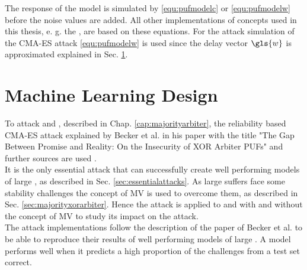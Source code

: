 The response of the \apuf model is simulated by \ref{equ:pufmodelc} or \ref{equ:pufmodelw} before the noise values are added.
All other implementations of \puf concepts used in this thesis, e. g. the \mpuf, are based on these \apuf equations.
For the attack simulation of the \ac{CMA-ES} attack \ref{equ:pufmodelw} is used since the delay vector $\gls{w}$ is approximated explained in Sec. \ref{sec:machinelearningdesign}.


\section{Machine Learning Design}
\label{sec:machinelearningdesign}

To attack \mpufs and \mxpufs, described in Chap. \ref{cap:majorityarbiter}, the reliability based \ac{CMA-ES} attack explained by Becker et al. in his paper with the title "The Gap Between Promise and Reality: On the Insecurity of XOR Arbiter PUFs" and further sources are used \cite{Becker2015ThePUFs,2017CMA-ES,Hansen2011TheTutorial,Hansen2006TheReview}.\\
It is the only essential attack that can successfully create well performing models of large \xpufs, as described in Sec. \ref{sec:essentialattacks}.
As large \xpufs suffers face some stability challenges the concept of \ac{MV} is used to overcome them, as described in Sec. \ref{sec:majorityxorarbiter}.
Hence the attack is applied to \apufs and \xpufs with and without the concept of \ac{MV} to study its impact on the attack.\\
The attack implementations follow the description of the paper of Becker et al. to be able to reproduce their results of well performing models of large \xpufs \cite{Becker2015ThePUFs}.
A model performs well when it predicts a high proportion of the challenges from a test set correct.


